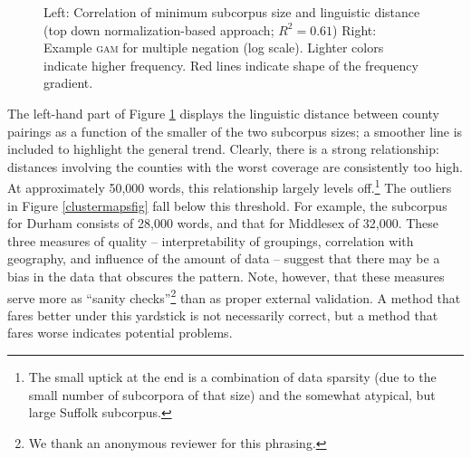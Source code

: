 \documentclass[output=paper]{LSP/langsci}
\begin{document}
\begin{figure}[tbp]
\begin{minipage}[b]{0.45\linewidth}
\end{minipage}
\caption{Left: Correlation of minimum subcorpus size and linguistic distance (top down normalization-based approach; $R^2=0.61$) Right: Example \textsc{gam} for multiple negation (log scale). Lighter colors indicate higher frequency. Red lines indicate shape of the frequency gradient.} \label{fig:cor-ling}
\end{figure}


The left-hand part of Figure \ref{fig:cor-ling} displays the linguistic distance between county pairings as a function of the smaller of the two subcorpus sizes; a smoother line is included to highlight the general trend.
Clearly, there is a strong relationship: distances involving the counties with the worst coverage are consistently too high. 
At approximately 50,000 words, this relationship largely levels off.\footnote{The small uptick at the end is a combination of data sparsity (due to the small number of subcorpora of that size) and the somewhat atypical, but large Suffolk subcorpus.}
The outliers in Figure \ref{clustermapsfig} fall below this threshold. For example, the subcorpus for Durham consists of 28,000 words, and that for Middlesex of 32,000.
These three measures of quality -- interpretability of groupings, correlation with geography, and influence of the amount of data -- suggest that there may be a bias in the data that obscures the pattern.
Note, however, that these measures serve more as ``sanity checks''\footnote{We thank an anonymous reviewer for this phrasing.} than as proper external validation.
A method that fares better under this yardstick is not necessarily correct, but a method that fares worse indicates potential problems.
\end{document}

